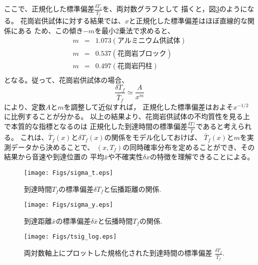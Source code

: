 ここで、正規化した標準偏差$\frac{\delta T_f}{\bar{T}_f}$を、両対数グラフとして
描くと，図\ref{fig:fig15}のようになる。
花崗岩供試体に対する結果では、$x$と正規化した標準偏差はほぼ直線的な関係にある
ため、この傾き$-m$を最小2乗法で求めると、
\begin{eqnarray}
	m &=& 1.073 (アルミニウム供試体) \\
	m &=& 0.537 (花崗岩ブロック)\\
	m &=& 0.497 (花崗岩円柱)\\
\end{eqnarray}
となる。従って、花崗岩供試体の場合、
\begin{equation}
	\frac{\delta T_f }{\bar{T}_f} \simeq \frac{A}{x^m}
\end{equation}
により、定数$A$と$m$を調整して近似すれば，
正規化した標準偏差はおよそ$x^{-1/2}$に比例することが分かる。
以上の結果より、花崗岩供試体の不均質性を見る上で本質的な指標となるのは
正規化した到達時間の標準偏差$\frac{\delta T/}{\bar T}$であると考えられる。
これは、$\bar{T}_f(x)$と$\delta T_f(x)$の関係をモデル化しておけば、
$\bar{T}_f(x)$と$m$を実測データから決めることで、
$(x,T_f)$の同時確率分布を定めることができ、その結果から音速や到達位置の
平均$\bar{x}$や不確実性$\delta x$の特徴を理解できることによる。
\begin{figure}
\begin{center}
	\texttt{[image: Figs/sigma\_t.eps]}
	\caption{到達時間$T_f$の標準偏差$\delta T_f$と伝播距離の関係. }
	\label{fig:fig13}
\end{center}
\end{figure}
\begin{figure}
\begin{center}
	\texttt{[image: Figs/sigma\_y.eps]}
	\caption{到達距離$\bar{x}$の標準偏差$\delta \bar{x}$と伝播時間$T_f$の関係. }
	\label{fig:fig14}
\end{center}
\end{figure}
\begin{figure}
\begin{center}
	\texttt{[image: Figs/tsig\_log.eps]}
	\caption{
		両対数軸上にプロットした規格化された到達時間の標準偏差
			$\frac{\delta T_f}{\bar{T}_f}$. 
		}
	\label{fig:fig15}
\end{center}
\end{figure}
